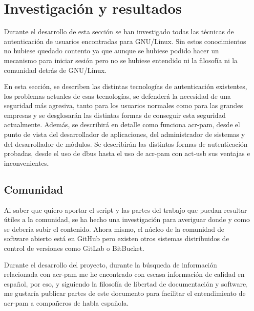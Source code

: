 \documentclass[twoside, titlepage, 12pt, a4paper]{article}
\let\oldsection\section
\def\section{\cleardoublepage\oldsection}
\begin{document}
\section{Investigación y resultados}
Durante el desarrollo de esta sección se han investigado todas las técnicas de autenticación de usuarios encontradas para \gls{GNU/Linux}. Sin estos conocimientos no hubiese quedado contento ya que aunque se hubiese podido hacer un mecanismo para iniciar sesión pero no se hubiese entendido ni la filosofía ni la comunidad detrás de \gls{GNU/Linux}. \par
En esta sección, se describen las distintas tecnologías de autenticación existentes, los problemas actuales de esas tecnologías, se defenderá la necesidad de una seguridad más agresiva, tanto para los usuarios normales como para las grandes empresas y se desglosarán las distintas formas de conseguir esta seguridad actualmente. Además, se describirá en detalle como funciona \gls{acr-pam}, desde el punto de vista del desarrollador de aplicaciones, del administrador de sistemas y del desarrollador de módulos. Se describirán las distintas formas de autenticación probadas, desde el uso de \gls{dbus} hasta el uso de \gls{acr-pam} con \gls{act-usb} sus ventajas e inconvenientes.
\subsection{Comunidad}
Al saber que quiero aportar el script y las partes del trabajo que puedan resultar útiles a la comunidad, se ha hecho una investigación para averiguar donde y como se debería subir el contenido. Ahora mismo, el núcleo de la comunidad de software abierto está en \gls{GitHub} pero existen otros sistemas distribuidos de control de versiones como GitLab o BitBucket.\par
Durante el desarrollo del proyecto, durante la búsqueda de información relacionada con \gls{acr-pam} me he encontrado con escasa información de calidad en español, por eso, y siguiendo la filosofía de libertad de documentación y software, me gustaría publicar partes de este documento para facilitar el entendimiento de \gls{acr-pam} a compañeros de habla española.
\end{document}

